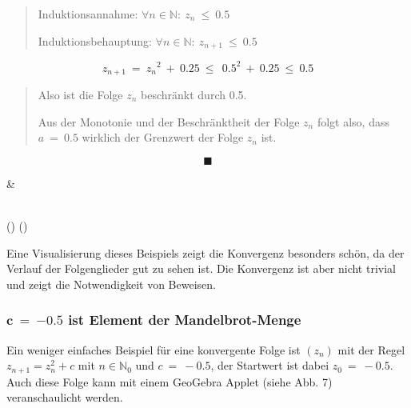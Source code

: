 \documentclass{book}
\begin{document}
\begin{longtable}[]
\begin{minipage}[b]{\linewidth}
\begin{quote}
Induktionsannahme: \(\forall n \in \mathbb{N:\ }z_{n}\  \leq \ 0.5\)

Induktionsbehauptung:
\(\forall n \in \mathbb{N:\ }z_{n + 1}\  \leq \ 0.5\)
\end{quote}

\[z_{n + 1}\  = \ {z_{n}}^{2}\  + \ 0.25\  \leq \ \ {0.5}^{2}\  + \ 0.25\  \leq \ 0.5\]

\begin{quote}
Also ist die Folge \(z_{n}\) beschränkt durch 0.5.

Aus der Monotonie und der Beschränktheit der Folge \(z_{n}\) folgt also,
dass \(a\  = \ 0.5\) wirklich der Grenzwert der Folge \(z_{n}\) ist.
\end{quote}

\[\blacksquare\]
\end{minipage} & \begin{minipage}[b]{\linewidth}\raggedright
\end{minipage} \\
\midrule()
\endhead
\bottomrule()
\end{longtable}

Eine Visualisierung dieses Beispiels zeigt die Konvergenz besonders
schön, da der Verlauf der Folgenglieder gut zu sehen ist. Die Konvergenz
ist aber nicht trivial und zeigt die Notwendigkeit von Beweisen.

\hypertarget{mathbfc-mathbf-mathbf0.5-ist-element-der-mandelbrot-menge}{%
\subsubsection{\texorpdfstring{\(\mathbf{c\  = \ }\mathbf{-}\mathbf{0.5}\)
ist Element der
Mandelbrot-Menge}{\textbackslash mathbf\{c\textbackslash{}  = \textbackslash{} \}\textbackslash mathbf\{-\}\textbackslash mathbf\{0.5\} ist Element der Mandelbrot-Menge}}\label{mathbfc-mathbf-mathbf0.5-ist-element-der-mandelbrot-menge}}

Ein weniger einfaches Beispiel für eine konvergente Folge ist
\(\left( z_{n} \right)\) mit der Regel \(z_{n + 1} = z_{n}^{2} + c\) mit
\(n \in \mathbb{N}_{0}\) und \(c\  = \  - 0.5\), der Startwert ist dabei
\(z_{0}\  = \  - 0.5\). Auch diese Folge kann mit einem GeoGebra Applet
(siehe Abb. 7) veranschaulicht werden.
\end{document}

